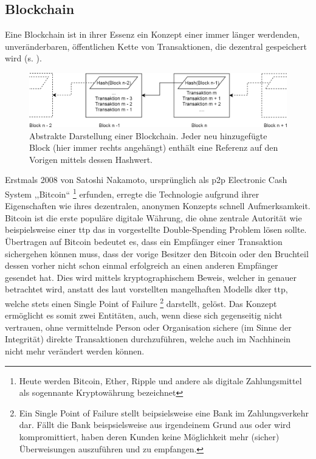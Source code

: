 \subsection{Blockchain}
\label{sec:sota_blockchain}
    Eine Blockchain ist in ihrer Essenz ein Konzept einer immer länger werdenden, unveränderbaren, öffentlichen Kette von Transaktionen, die dezentral gespeichert wird (s. ). 
    \smallskip
    \begin{figure}[H]
    	\centering
    	\includegraphics[width=\textwidth]{graphics/bc_highlvl.png}
    	\caption[Abstrakte Darstellung einer Blockchain]{Abstrakte Darstellung einer Blockchain. Jeder neu hinzugefügte Block (hier immer rechts angehängt) enthält eine Referenz auf den Vorigen mittels dessen Hashwert.}
    	\label{fig:bc_highlvl}
    \end{figure}
    \noindent Erstmals 2008 von Satoshi Nakamoto, ursprünglich als \gls{p2p} Electronic Cash System ,,Bitcoin``
    \!\footnote{Heute werden Bitcoin, Ether, Ripple und andere als digitale Zahlungsmittel als sogennante Kryptowährung bezeichnet} 
    erfunden, erregte die Technologie aufgrund ihrer Eigenschaften wie ihres dezentralen, anonymen Konzepts schnell Aufmerksamkeit. 
    Bitcoin ist die erste populäre digitale Währung, die ohne zentrale Autorität wie beispielsweise einer \gls{ttp} das in  vorgestellte Double-Spending Problem lösen sollte\cite{Nakamoto2008}. 
    Übertragen auf Bitcoin bedeutet es, dass ein Empfänger einer Transaktion sichergehen können muss, dass der vorige Besitzer den Bitcoin oder den Bruchteil dessen vorher nicht schon einmal erfolgreich an einen anderen Empfänger gesendet hat.
    Dies wird mittels kryptographischem Beweis, welcher in  genauer betrachtet wird, anstatt des laut \citeauthor{Nakamoto2008} vorstellten mangelhaften Modells dker \gls{ttp}, welche stets einen Single Point of Failure
    \!\footnote{Ein Single Point of Failure stellt beipsielsweise eine Bank im Zahlungsverkehr dar.
    Fällt die Bank beispsielsweise aus irgendeinem Grund aus oder wird kompromittiert, haben deren Kunden keine Möglichkeit mehr (sicher) Überweisungen auszuführen und zu empfangen.}
    darstellt, gelöst. 
    Das Konzept ermöglicht es somit zwei Entitäten, auch, wenn diese sich gegenseitig nicht vertrauen, ohne vermittelnde Person oder Organisation sichere (im Sinne der Integrität) direkte Transaktionen  durchzuführen, welche auch im Nachhinein nicht mehr verändert werden können.\cite{Christidis2016}
    
